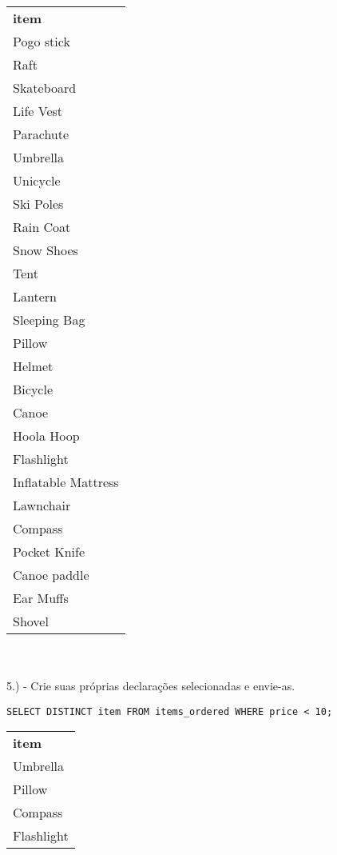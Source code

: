 \begin{tabular}{l}
    {\textbf{item}}       \\
    {Pogo stick}          \\
    {Raft}                \\
    {Skateboard}          \\
    {Life Vest}           \\
    {Parachute}           \\
    {Umbrella}            \\
    {Unicycle}            \\
    {Ski Poles}           \\
    {Rain Coat}           \\
    {Snow Shoes}          \\
    {Tent}                \\
    {Lantern}             \\
    {Sleeping Bag}        \\
    {Pillow}              \\
    {Helmet}              \\
    {Bicycle}             \\
    {Canoe}               \\
    {Hoola Hoop}          \\
    {Flashlight}          \\
    {Inflatable Mattress} \\
    {Lawnchair}           \\
    {Compass}             \\
    {Pocket Knife}        \\
    {Canoe paddle}        \\
    {Ear Muffs}           \\
    {Shovel}             
\end{tabular} \\ \\

5.) - Crie suas próprias declarações selecionadas e envie-as.

\begin{lstlisting}
SELECT DISTINCT item FROM items_ordered WHERE price < 10;
\end{lstlisting}

\begin{tabular}{l}
    {\textbf{item}}       \\
    {Umbrella}            \\
    {Pillow}              \\
    {Compass}             \\
    {Flashlight}
\end{tabular} \\ \\

